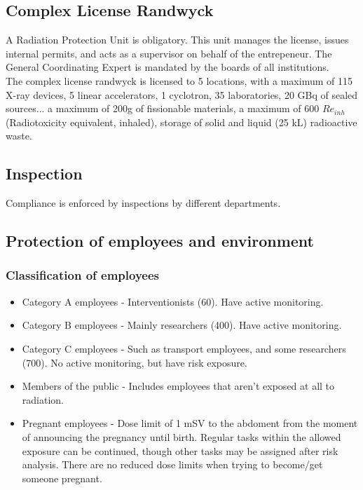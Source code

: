\subsection{Complex License Randwyck}
A Radiation Protection Unit is obligatory. This unit manages the license, issues internal permits, and acts as a supervisor on behalf of the entrepeneur. The General Coordinating Expert is mandated by the boards of all institutions. \\
The complex license randwyck is licensed to 5 locations, with a maximum of 115 X-ray devices, 5 linear accelerators, 1 cyclotron, 35 laboratories, 20 GBq of sealed sources... a maximum of 200g of fissionable materials, a maximum of 600 $Re_{inh}$ (Radiotoxicity equivalent, inhaled), storage of solid and liquid (25 kL) radioactive waste. \\

\subsection{Inspection}
Compliance is enforced by inspections by different departments.

\subsection{Protection of employees and environment}
\subsubsection{Classification of employees}
\begin{itemize}
	\item Category A employees - Interventionists (60). Have active monitoring.
	\item Category B employees - Mainly researchers (400). Have active monitoring.
	\item Category C employees - Such as transport employees, and some researchers (700). No active monitoring, but have risk exposure.
	\item Members of the public - Includes employees that aren't exposed at all to radiation.
	\item Pregnant employees - Dose limit of 1 mSV to the abdoment from the moment of announcing the pregnancy until birth. Regular tasks within the allowed exposure can be continued, though other tasks may be assigned after risk analysis. There are no reduced dose limits when trying to become/get someone pregnant.
\end{itemize}

